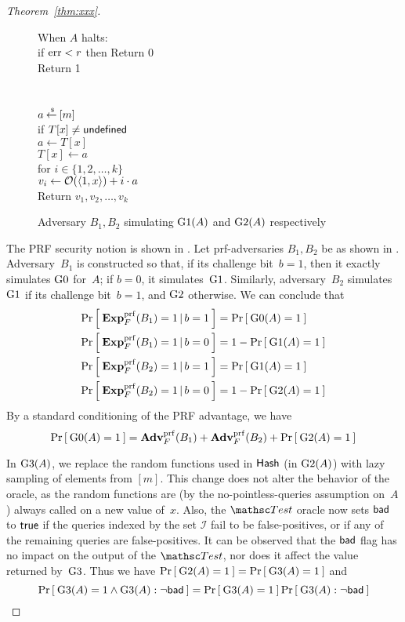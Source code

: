 \begin{proof}[Theorem~\ref{thm:xxx}]
\begin{figure}[tp]
{{When $A$ halts: \\
\nudge if $\mathrm{err}  < r$ then Return 0\\
\nudge Return 1\\\\
%
\\
$a {\:\stackrel{{\scriptscriptstyle \hspace{0.2em}\$}} {\leftarrow}\:} [m]$\\
if $T[x] \neq \mathsf{undefined}$\\
\nudge $a \gets T[x]$\\
$T[x] \gets a$\\
for $i \in \{1,2,\ldots,k\}$\\
\nudge $v_i \gets {\cal O}(\langle 1,x \rangle) + i\cdot a$\\
Return ${v_1,v_2,\ldots,v_k}$
}
}
\caption{Adversary $B_1, B_2$ simulating $\text{G1}(A)$ and $\text{G2}(A)$ respectively}\label{fig:BGame1}
\end{figure}

The PRF security notion is shown in . Let
prf-adversaries $B_1, B_2$ be as shown in .
Adversary~$B_1$ is constructed so that, if its challenge bit~$b=1$,
then it exactly simulates $\text{G0}$ for~$A$; if $b=0$, it
simulates~$\text{G1}$.  Similarly, adversary~$B_2$ simulates~$\text{G1}$
if its challenge bit~$b=1$, and $\text{G2}$ otherwise.  We can conclude
that 
\begin{align*}
\Prob{\ExpPRF{F}{B_1} = 1\,|\,b=1} &= \Prob{\game{0}(A)=1} \\%
\Prob{\ExpPRF{F}{B_1} = 1\,|\,b=0} &= 1-\Prob{\game{1}(A)=1} \\%
\Prob{\ExpPRF{F}{B_2} = 1\,|\,b=1} &= \Prob{\game{1}(A)=1} \\%
\Prob{\ExpPRF{F}{B_2} = 1\,|\,b=0} &= 1-\Prob{\game{2}(A)=1} \\%
\end{align*}
%
\noindent
By a standard conditioning of the PRF advantage, we have 
\begin{equation*}
\Prob{\game{0}(A)=1} = \AdvPRF{F}{B_1} +\AdvPRF{F}{B_2} + \Prob{\game{2}(A)=1}%
\end{equation*}


In $\text{G3}(A)$, we replace the random functions used in
$\mathsf{Hash}$ (in $\text{G2}(A)$) with lazy sampling of elements from
$[m]$.  This change does not alter the behavior of the oracle, as the
random functions are (by the no-pointless-queries assumption on~$A$) always called on a new
value of~$x$.
%
Also, the $\Test$ oracle now sets $\mathsf{bad}$ to $\mathsf{true}$ if the
queries indexed by the set $\mathcal{I}$ fail to be false-positives,
or if any of the remaining queries are false-positives. It can be
observed that the $\mathsf{bad}$ flag has no impact on the output of the
$\Test$, nor does it affect  the value returned
by~$\text{G3}$. Thus we have $\Pr\left[\: \text{G2}(A)=1 \:\right] =
\Pr\left[\: \text{G3}(A)=1 \:\right]$ and
\[
\Prob{\game{3}(A)=1 \wedge \game{3}(A): \neg\bad} = \Prob{\game{3}(A)=1} \Prob{\game{3}(A) : \neg\bad}%
\]


\end{proof}
